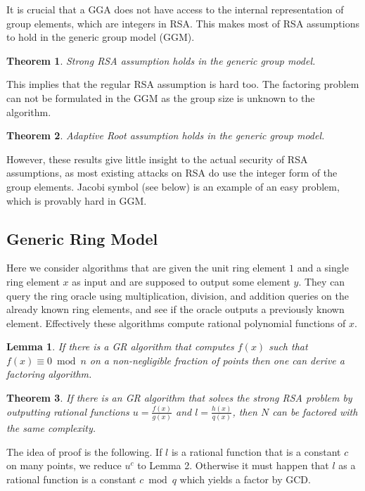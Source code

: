 \documentclass[a4paper]{article}
\newtheorem{theorem}{Theorem}
\newtheorem{lemma}{Lemma}
\begin{document}
It is crucial that a GGA does not have access to the internal representation of group elements, which are integers in RSA. 
This makes most of RSA assumptions to hold in the generic group model (GGM). 
\begin{theorem}\cite{DBLP:conf/eurocrypt/DamgardK02}
Strong RSA assumption holds in the generic group model.
\end{theorem}
This implies that the regular RSA assumption is hard too. The factoring problem can not be formulated in the GGM as the group size is unknown to the algorithm.
\begin{theorem}\cite{cryptoeprint:2019:1229}
Adaptive Root assumption holds in the generic group model.
\end{theorem}
However, these results give little insight to the actual security of RSA assumptions, as most existing attacks on RSA do use the integer form of the group elements. Jacobi symbol (see below) is an example of an easy problem, which is provably hard in GGM.

\subsection{Generic Ring Model}

Here we consider algorithms that are given the unit ring element $1$ and a single ring element $x$ as input and are supposed to output some element $y$. They can query the ring oracle using multiplication, division, and addition queries on the already known ring elements, and see if the oracle outputs a previously known element. Effectively these algorithms compute rational polynomial functions of $x$.

\begin{lemma}\cite{DBLP:conf/eurocrypt/AggarwalM09}
If there is a GR algorithm that computes $f(x)$ such that  $f(x)\equiv 0 \bmod{n}$ on a non-negligible fraction of points then one can derive a factoring algorithm.
\end{lemma}

\begin{theorem}\cite{aggarwal2011equivalence}
If there is an GR algorithm that solves the strong RSA problem by outputting rational functions $u=\frac{f(x)}{g(x)}$ and $l=\frac{h(x)}{q(x)}$, then $N$ can be factored with the same complexity.
\end{theorem}
The idea of proof is the following. If $l$ is a rational function that is a constant $c$ on many points, we reduce $u^c$ to Lemma 2. Otherwise it must happen that $l$ as a rational function is a constant $c\bmod{q}$ which yields a factor by GCD.
\end{document}
